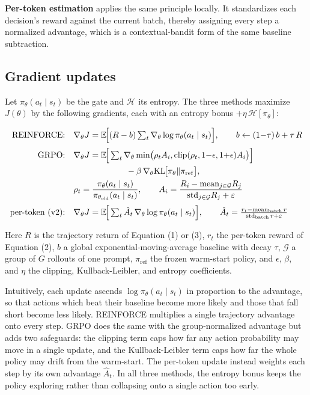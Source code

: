 \documentclass[11pt]{article}
\begin{document}
\textbf{Per-token estimation} applies the same principle locally. It standardizes each decision's reward
against the current batch, thereby assigning every step a normalized advantage, which is a
contextual-bandit form of the same baseline subtraction.

\subsection{Gradient updates}
Let $\pi_\theta(a_t\mid s_t)$ be the gate and $\mathcal{H}$ its entropy. The three methods maximize
$J(\theta)$ by the following gradients, each with an entropy bonus $+\eta\,\mathcal{H}[\pi_\theta]$:
\begin{small}
\begin{align}
\text{REINFORCE:}\quad
&\nabla_\theta J = \mathbb{E}\!\Big[(R-b)\textstyle\sum_t \nabla_\theta\log\pi_\theta(a_t\mid s_t)\Big],
\qquad b \leftarrow (1{-}\tau)\,b + \tau\,R \\[2pt]
\text{GRPO:}\quad
&\nabla_\theta J =
\mathbb{E}\!\Big[\textstyle\sum_t \nabla_\theta
\min\!\big(\rho_t A_i,\mathrm{clip}(\rho_t,1{-}\epsilon,1{+}\epsilon)A_i\big)\Big] \notag\\
&\hspace{22mm}{}- \beta\,\nabla_\theta\mathrm{KL}\!\big[\pi_\theta\Vert\pi_{\mathrm{ref}}\big], \notag\\
&\rho_t = \frac{\pi_\theta(a_t\mid s_t)}{\pi_{\theta_{\mathrm{old}}}(a_t\mid s_t)},
\qquad A_i = \frac{R_i-\mathrm{mean}_{j\in\mathcal{G}}R_j}{\mathrm{std}_{j\in\mathcal{G}}R_j+\varepsilon} \\[2pt]
\text{per-token (v2):}\quad
&\nabla_\theta J = \mathbb{E}\!\Big[\textstyle\sum_t \hat A_t\,\nabla_\theta\log\pi_\theta(a_t\mid s_t)\Big],
\qquad \hat A_t = \frac{r_t-\mathrm{mean}_{\mathrm{batch}}\,r}{\mathrm{std}_{\mathrm{batch}}\,r+\varepsilon}
\end{align}
\end{small}
Here $R$ is the trajectory return of Equation (1) or (3), $r_t$ the per-token reward of Equation (2),
$b$ a global exponential-moving-average baseline with decay $\tau$, $\mathcal{G}$ a group of $G$
rollouts of one prompt, $\pi_{\mathrm{ref}}$ the frozen warm-start policy, and $\epsilon$, $\beta$, and
$\eta$ the clipping, Kullback-Leibler, and entropy coefficients.

Intuitively, each update ascends $\log\pi_\theta(a_t\mid s_t)$ in proportion to the advantage, so that
actions which beat their baseline become more likely and those that fall short become less likely.
REINFORCE multiplies a single trajectory advantage onto every step. GRPO does the same with the
group-normalized advantage but adds two safeguards: the clipping term caps how far any action
probability may move in a single update, and the Kullback-Leibler term caps how far the whole policy
may drift from the warm-start. The per-token update instead weights each step by its own advantage
$\hat A_t$. In all three methods, the entropy bonus keeps the policy exploring rather than collapsing
onto a single action too early.
\end{document}

